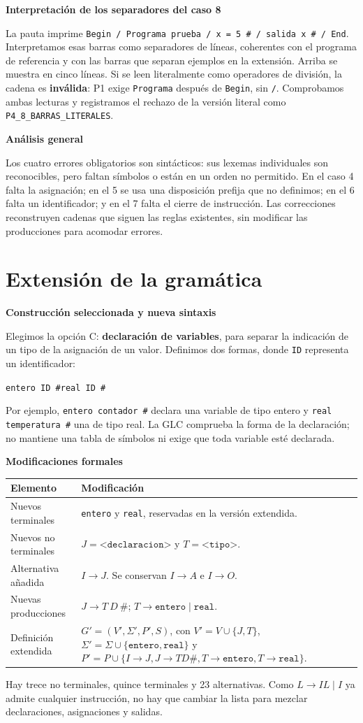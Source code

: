 \documentclass[11pt,letterpaper]{article}
\newcommand{\cod}[1]{\texttt{#1}}
\newcommand{\nt}[1]{\texttt{<#1>}}
\newcommand{\subtitulo}[1]{\vspace{5pt}\textbf{#1}\par\nopagebreak[4]}
\newcommand{\cab}[1]{\rowcolor{cabecera}#1}
\begin{document}
\subtitulo{Interpretación de los separadores del caso 8}
La pauta imprime \cod{Begin / Programa prueba / x = 5 \# / salida x \# / End}. Interpretamos esas barras como separadores de líneas, coherentes con el programa de referencia y con las barras que separan ejemplos en la extensión. Arriba se muestra en cinco líneas. Si se leen literalmente como operadores de división, la cadena es \textbf{inválida}: P1 exige \cod{Programa} después de \cod{Begin}, sin \cod{/}. Comprobamos ambas lecturas y registramos el rechazo de la versión literal como \cod{P4\_8\_BARRAS\_LITERALES}.

\subtitulo{Análisis general}
Los cuatro errores obligatorios son sintácticos: sus lexemas individuales son reconocibles, pero faltan símbolos o están en un orden no permitido. En el caso 4 falta la asignación; en el 5 se usa una disposición prefija que no definimos; en el 6 falta un identificador; y en el 7 falta el cierre de instrucción. Las correcciones reconstruyen cadenas que siguen las reglas existentes, sin modificar las producciones para acomodar errores.

\newpage
\section{Extensión de la gramática}
\subtitulo{Construcción seleccionada y nueva sintaxis}
Elegimos la opción C: \textbf{declaración de variables}, para separar la indicación de un tipo de la asignación de un valor. Definimos dos formas, donde \cod{ID} representa un identificador:
\begin{center}\cod{entero ID \#}\qquad\cod{real ID \#}\end{center}
Por ejemplo, \cod{entero contador \#} declara una variable de tipo entero y \cod{real temperatura \#} una de tipo real. La GLC comprueba la forma de la declaración; no mantiene una tabla de símbolos ni exige que toda variable esté declarada.

\subtitulo{Modificaciones formales}
\begin{tabularx}{\textwidth}{|p{3.2cm}|X|}\hline
\cab{\textbf{Elemento}&\textbf{Modificación}}\\\hline
Nuevos terminales&\cod{entero} y \cod{real}, reservadas en la versión extendida.\\\hline
Nuevos no terminales&$J=\nt{declaracion}$ y $T=\nt{tipo}$.\\\hline
Alternativa añadida&$I\to J$. Se conservan $I\to A$ e $I\to O$.\\\hline
Nuevas producciones&$J\to T\ D\ \cod{\#}$; $T\to\cod{entero}\mid\cod{real}$.\\\hline
Definición extendida&$G'=(V',\Sigma',P',S)$, con $V'=V\cup\{J,T\}$, $\Sigma'=\Sigma\cup\{\cod{entero},\cod{real}\}$ y $P'=P\cup\{I\to J,J\to TD\#,T\to\cod{entero},T\to\cod{real}\}$.\\\hline
\end{tabularx}
Hay trece no terminales, quince terminales y 23 alternativas. Como $L\to IL\mid I$ ya admite cualquier instrucción, no hay que cambiar la lista para mezclar declaraciones, asignaciones y salidas.
\end{document}
